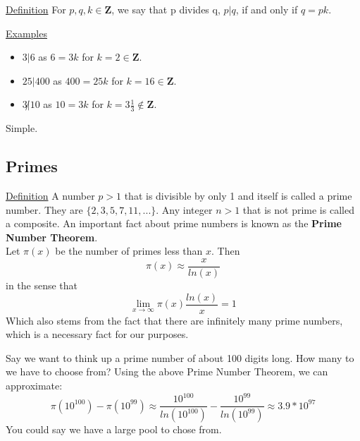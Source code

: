 \documentclass{article}
\begin{document}
        \underline{Definition} For $p, q, k \in\mathbf{Z}$, we say that p divides q, $p|q$, if and only if $q=pk$.
        
        \noindent\underline{Examples}
        \begin{itemize}
            \item $3|6$ as $6=3k$ for $k=2\in\mathbf{Z}$.
            \item $25|400$ as $400=25k$ for $k=16\in\mathbf{Z}$.
            \item $3\not|10$ as $10=3k$ for $k=3\frac{1}{3}\not\in\mathbf{Z}$.
        \end{itemize}
        Simple.
		
        \subsection{Primes}
        \underline{Definition} A number $p>1$ that is divisible by only 1 and itself is called a prime number.  They are $\{2,3,5,7,11,...\}$.  Any integer $n>1$ that is not prime is called a composite.  An important fact about prime numbers is known as the \textbf{Prime Number Theorem}.\\Let $\pi(x)$ be the number of primes less than $x$. Then $$\pi(x)\approx\frac{x}{ln(x)} $$ in the sense that $$\lim_{x\to\infty}\pi(x)\frac{ln(x)}{x}=1 $$ Which also stems from the fact that there are infinitely many prime numbers, which is a necessary fact for our purposes.
        
        Say we want to think up a prime number of about 100 digits long.  How many to we have to choose from?  
        Using the above Prime Number Theorem, we can approximate: $$\pi(10^{100})-\pi(10^{99})\approx\frac{10^{100}}{ln(10^{100})} - \frac{10^{99}}{ln(10^{99})} \approx 3.9*10^{97}$$
        You could say we have a large pool to chose from.
        
        
        
        
\end{document}
